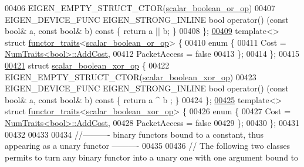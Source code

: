 \begin{DoxyCode}
00406   EIGEN\_EMPTY\_STRUCT\_CTOR(\hyperlink{struct_eigen_1_1internal_1_1scalar__boolean__or__op}{scalar\_boolean\_or\_op})
00407   EIGEN\_DEVICE\_FUNC EIGEN\_STRONG\_INLINE \textcolor{keywordtype}{bool} operator() (\textcolor{keyword}{const} \textcolor{keywordtype}{bool}& a, \textcolor{keyword}{const} \textcolor{keywordtype}{bool}& b)\textcolor{keyword}{ const }\{ \textcolor{keywordflow}{return} a || 
      b; \}
00408 \};
\hyperlink{struct_eigen_1_1internal_1_1functor__traits_3_01scalar__boolean__or__op_01_4}{00409} \textcolor{keyword}{template}<> \textcolor{keyword}{struct }\hyperlink{struct_eigen_1_1internal_1_1functor__traits}{functor\_traits}<\hyperlink{struct_eigen_1_1internal_1_1scalar__boolean__or__op}{scalar\_boolean\_or\_op}> \{
00410   \textcolor{keyword}{enum} \{
00411     Cost = \hyperlink{group___core___module_struct_eigen_1_1_num_traits}{NumTraits<bool>::AddCost},
00412     PacketAccess = \textcolor{keyword}{false}
00413   \};
00414 \};
00415 
\hyperlink{struct_eigen_1_1internal_1_1scalar__boolean__xor__op}{00421} \textcolor{keyword}{struct }\hyperlink{struct_eigen_1_1internal_1_1scalar__boolean__xor__op}{scalar\_boolean\_xor\_op} \{
00422   EIGEN\_EMPTY\_STRUCT\_CTOR(\hyperlink{struct_eigen_1_1internal_1_1scalar__boolean__xor__op}{scalar\_boolean\_xor\_op})
00423   EIGEN\_DEVICE\_FUNC EIGEN\_STRONG\_INLINE \textcolor{keywordtype}{bool} operator() (\textcolor{keyword}{const} \textcolor{keywordtype}{bool}& a, \textcolor{keyword}{const} \textcolor{keywordtype}{bool}& b)\textcolor{keyword}{ const }\{ \textcolor{keywordflow}{return} a ^ b
      ; \}
00424 \};
\hyperlink{struct_eigen_1_1internal_1_1functor__traits_3_01scalar__boolean__xor__op_01_4}{00425} \textcolor{keyword}{template}<> \textcolor{keyword}{struct }\hyperlink{struct_eigen_1_1internal_1_1functor__traits}{functor\_traits}<\hyperlink{struct_eigen_1_1internal_1_1scalar__boolean__xor__op}{scalar\_boolean\_xor\_op}> \{
00426   \textcolor{keyword}{enum} \{
00427     Cost = \hyperlink{group___core___module_struct_eigen_1_1_num_traits}{NumTraits<bool>::AddCost},
00428     PacketAccess = \textcolor{keyword}{false}
00429   \};
00430 \};
00431 
00432 
00433 
00434 \textcolor{comment}{//---------- binary functors bound to a constant, thus appearing as a unary functor ----------}
00435 
00436 \textcolor{comment}{// The following two classes permits to turn any binary functor into a unary one with one argument bound to
}
\end{DoxyCode}
